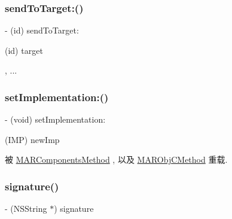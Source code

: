 \mbox{\label{interface_m_a_r_method_ab333674bc483732ef27e9e9c905631df}} 
\subsubsection{\texorpdfstring{send\+To\+Target\+:()}{sendToTarget:()}}
{\footnotesize\ttfamily -\/ (id) send\+To\+Target\+: \begin{DoxyParamCaption}\item[{(id)}]{target }\item[{,}]{... }\end{DoxyParamCaption}}

\mbox{\label{interface_m_a_r_method_abf38fb96f245938c1454e40cd35db130}} 
\subsubsection{\texorpdfstring{set\+Implementation\+:()}{setImplementation:()}}
{\footnotesize\ttfamily -\/ (void) set\+Implementation\+: \begin{DoxyParamCaption}\item[{(I\+MP)}]{new\+Imp }\end{DoxyParamCaption}}



被 \hyperlink{interface_m_a_r_components_method_a597ccc0d0565e2c53a3e6f782ae2729d}{M\+A\+R\+Components\+Method} , 以及 \hyperlink{interface_m_a_r_obj_c_method_a42623f6469580543e5606a1a73bbb22d}{M\+A\+R\+Obj\+C\+Method} 重载.

\mbox{\label{interface_m_a_r_method_a95142a29169eb3b6d4b3c5e8d0db54a5}} 
\subsubsection{\texorpdfstring{signature()}{signature()}}
{\footnotesize\ttfamily -\/ (N\+S\+String $\ast$) signature \begin{DoxyParamCaption}{ }\end{DoxyParamCaption}}



